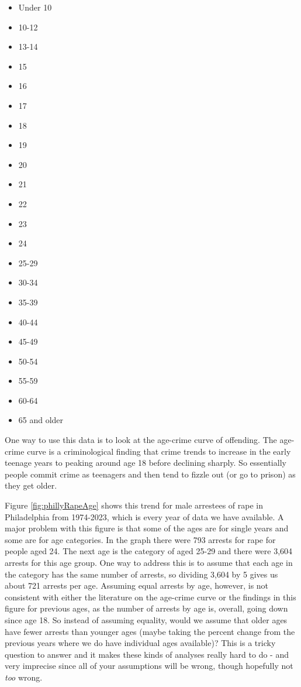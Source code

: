 \documentclass[
]{krantz}
\providecommand{\tightlist}{%
  \setlength{\itemsep}{0pt}\setlength{\parskip}{0pt}}
\begin{document}
\begin{itemize}
\tightlist
\item
  Under 10
\item
  10-12
\item
  13-14
\item
  15
\item
  16
\item
  17
\item
  18
\item
  19
\item
  20
\item
  21
\item
  22
\item
  23
\item
  24
\item
  25-29
\item
  30-34
\item
  35-39
\item
  40-44
\item
  45-49
\item
  50-54
\item
  55-59
\item
  60-64
\item
  65 and older
\end{itemize}

One way to use this data is to look at the age-crime curve
of offending. The age-crime curve is a criminological
finding that crime trends to increase in the early teenage
years to peaking around age 18 before declining sharply. So
essentially people commit crime as teenagers and then tend
to fizzle out (or go to prison) as they get older.

Figure \ref{fig:phillyRapeAge} shows this trend for male
arrestees of rape in Philadelphia from 1974-2023, which is
every year of data we have available. A major problem with
this figure is that some of the ages are for single years
and some are for age categories. In the graph there were 793
arrests for rape for people aged 24. The next age is the
category of aged 25-29 and there were 3,604 arrests for this
age group. One way to address this is to assume that each
age in the category has the same number of arrests, so
dividing 3,604 by 5 gives us about 721 arrests per age.
Assuming equal arrests by age, however, is not consistent
with either the literature on the age-crime curve or the
findings in this figure for previous ages, as the number of
arrests by age is, overall, going down since age 18. So
instead of assuming equality, would we assume that older
ages have fewer arrests than younger ages (maybe taking the
percent change from the previous years where we do have
individual ages available)? This is a tricky question to
answer and it makes these kinds of analyses really hard to
do - and very imprecise since all of your assumptions will
be wrong, though hopefully not \emph{too} wrong.
\end{document}
